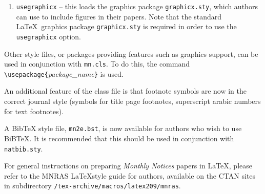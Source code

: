 \documentclass[useAMS]{mn2e}
\begin{document}
\begin{enumerate}
Items in the reference list must be of the form\\
\verb"\bibitem[\protect\citeauthoryear{"\textit{author\_names}\verb"}{"\textit{year}\verb"}]{"\textit{key}\verb"}"
Text of reference ...\\
for one-, two- and multi-author papers, or\\
\verb"\bibitem[\protect\citeauthoryear{"\textit{three\_author\_names}\verb"}{"\textit{first\_author\_etal}\verb"}{"\textit{year}\verb"}]{"\textit{key}\verb"}"
Text of reference ...\\
for three-author papers.

Note that Patrick Daly's package \verb"natbib.sty" is required in
order to use the \verb"usenatbib" option.

We recommend that authors use \verb"natbib.sty" as their standard
cross-referencing package, because of the flexibility in citation style
that it provides.

\item \verb"usegraphicx" -- this loads the graphics package
\verb"graphicx.sty", which authors can use to include figures in
their papers. Note that the standard \LaTeX\
 graphics package \verb"graphicx.sty" is
 required in order to use the \verb"usegraphicx" option.
\end{enumerate}

Other style files, or packages providing features such as graphics
support, can be used in conjunction with \verb"mn.cls". To do
this, the command
\verb"\usepackage{"\textit{package\_name}\verb"}" is used.

An additional feature of the class file is that footnote symbols
are now in the correct journal style (symbols for title page
footnotes, superscript arabic numbers for text footnotes).

A BibTeX style file, \verb"mn2e.bst", is now available for
authors who wish to use BiBTeX. It is recommended that this
should be used in conjunction with \verb"natbib.sty".

For general instructions on preparing \textit{Monthly Notices} papers in
\LaTeX, please refer to the MNRAS \LaTeX style guide for authors,
available on the CTAN sites in subdirectory
\verb"/tex-archive/macros/latex209/mnras".

 \label{lastpage}
\end{document}
